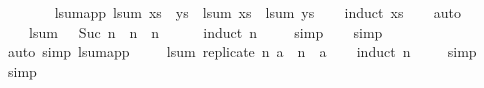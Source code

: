 \begin{isabellebody}
\ {\isachardoublequoteopen}{\isacharparenleft}{\kern0pt}{\isacharunderscore}{\kern0pt}\ {\isacharhash}{\kern0pt}\ {\isacharunderscore}{\kern0pt}{\isacharparenright}{\kern0pt}\ {\isacharat}{\kern0pt}\ {\isacharunderscore}{\kern0pt}{\isachardoublequoteclose}\ \isanewline
\isanewline
{}\isamarkupfalse%
\ lsum{\isacharunderscore}{\kern0pt}app{\isacharcolon}{\kern0pt}\ {\isachardoublequoteopen}lsum\ {\isacharparenleft}{\kern0pt}xs\ {\isacharat}{\kern0pt}\ ys{\isacharparenright}{\kern0pt}\ {\isacharequal}{\kern0pt}\ lsum\ xs\ {\isacharplus}{\kern0pt}\ lsum\ ys{\isachardoublequoteclose}\isanewline
%
\isadelimproof
\ \ %
\endisadelimproof
%
\isatagproof
{}\isamarkupfalse%
\ {\isacharparenleft}{\kern0pt}induct\ xs{\isacharparenright}{\kern0pt}\isanewline
\ \ \isamarkupfalse%
\ auto%
\endisatagproof
{\isafoldproof}%
%
\isadelimproof
\isanewline
%
\endisadelimproof
\isanewline
{}\isamarkupfalse%
\isanewline
\ \ {\isachardoublequoteopen}{}\ {\isacharasterisk}{\kern0pt}\ lsum\ {\isacharbrackleft}{\kern0pt}{}\ {\isachardot}{\kern0pt}{\isachardot}{\kern0pt}{\isacharless}{\kern0pt}\ Suc\ n{\isacharbrackright}{\kern0pt}\ {\isacharequal}{\kern0pt}\ n\ {\isacharasterisk}{\kern0pt}\ {\isacharparenleft}{\kern0pt}n\ {\isacharplus}{\kern0pt}\ {}{\isacharparenright}{\kern0pt}{\isachardoublequoteclose}\isanewline
%
\isadelimproof
\ \ %
\endisadelimproof
%
\isatagproof
{}\isamarkupfalse%
\ {\isacharparenleft}{\kern0pt}induct\ n{\isacharparenright}{\kern0pt}\isanewline
\ \ \ \isamarkupfalse%
\ simp\isanewline
\ \ \isamarkupfalse%
\ simp\isanewline
\ \ \isamarkupfalse%
\ {\isacharparenleft}{\kern0pt}auto\ simp{\isacharcolon}{\kern0pt}\ lsum{\isacharunderscore}{\kern0pt}app{\isacharparenright}{\kern0pt}\isanewline
\ \ \isamarkupfalse%
%
\endisatagproof
{\isafoldproof}%
%
\isadelimproof
\isanewline
%
\endisadelimproof
\isanewline
{}\isamarkupfalse%
\isanewline
\ \ {\isachardoublequoteopen}lsum\ {\isacharparenleft}{\kern0pt}replicate\ n\ a{\isacharparenright}{\kern0pt}\ {\isacharequal}{\kern0pt}\ n\ {\isacharasterisk}{\kern0pt}\ a{\isachardoublequoteclose}\isanewline
%
\isadelimproof
\ \ %
\endisadelimproof
%
\isatagproof
{}\isamarkupfalse%
\ {\isacharparenleft}{\kern0pt}induct\ n{\isacharparenright}{\kern0pt}\isanewline
\ \ \ \isamarkupfalse%
\ simp\isanewline
\ \ \isamarkupfalse%
\ simp\isanewline
\ \ \isamarkupfalse%

\end{isabellebody}
